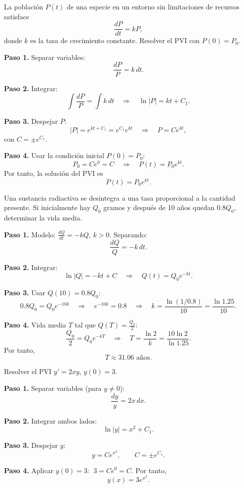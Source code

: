 \begin{example}
La población \(P(t)\) de una especie en un entorno sin limitaciones de recursos satisface
\[
\frac{dP}{dt} = kP,
\]
donde \(k\) es la tasa de crecimiento constante. Resolver el PVI con \(P(0)=P_0\).

\begin{myproof}
\textbf{Paso 1.} Separar variables:
\[
\frac{dP}{P} = k\,dt.
\]

\textbf{Paso 2.} Integrar:
\[
\int \frac{dP}{P} = \int k\,dt \quad\Longrightarrow\quad \ln|P| = kt + C_1.
\]

\textbf{Paso 3.} Despejar \(P\):
\[
|P| = e^{kt+C_1} = e^{C_1}e^{kt} \quad\Longrightarrow\quad P = C e^{kt},
\]
con \(C = \pm e^{C_1}\).

\textbf{Paso 4.} Usar la condición inicial \(P(0)=P_0\):
\[
P_0 = C e^{0} = C \quad\Longrightarrow\quad P(t) = P_0 e^{kt}.
\]
Por tanto, la solución del PVI es
\[
\boxed{P(t) = P_0 e^{kt}}.
\]
\end{myproof}
\end{example}

\begin{example}
Una sustancia radiactiva se desintegra a una tasa proporcional a la cantidad presente. Si inicialmente hay \(Q_0\) gramos y después de 10 años quedan \(0.8Q_0\), determinar la vida media.

\begin{myproof}
\textbf{Paso 1.} Modelo: \(\frac{dQ}{dt} = -kQ\), \(k>0\). Separando:
\[
\frac{dQ}{Q} = -k\,dt.
\]

\textbf{Paso 2.} Integrar:
\[
\ln|Q| = -kt + C \quad\Longrightarrow\quad Q(t) = Q_0 e^{-kt}.
\]

\textbf{Paso 3.} Usar \(Q(10)=0.8Q_0\):
\[
0.8Q_0 = Q_0 e^{-10k} \quad\Longrightarrow\quad e^{-10k}=0.8 \quad\Longrightarrow\quad k = \frac{\ln(1/0.8)}{10} = \frac{\ln 1.25}{10}.
\]

\textbf{Paso 4.} Vida media \(T\) tal que \(Q(T)=\frac{Q_0}{2}\):
\[
\frac{Q_0}{2} = Q_0 e^{-kT} \quad\Longrightarrow\quad T = \frac{\ln 2}{k} = \frac{10\ln 2}{\ln 1.25}.
\]
Por tanto,
\[
\boxed{T \approx 31.06 \text{ años}}.
\]
\end{myproof}
\end{example}

\begin{example}
Resolver el PVI $y'=2xy$, $y(0)=3$.

\begin{myproof}
\textbf{Paso 1.} Separar variables (para $y\neq 0$):
\[
\frac{dy}{y}=2x\,dx.
\]

\textbf{Paso 2.} Integrar ambos lados:
\[
\ln|y|=x^2+C_1.
\]

\textbf{Paso 3.} Despejar $y$:
\[
y=Ce^{x^2},\qquad C=\pm e^{C_1}.
\]

\textbf{Paso 4.} Aplicar $y(0)=3$: $\;3=Ce^{0}=C$. Por tanto,
\[
\boxed{y(x)=3e^{x^2}}.
\]
\end{myproof}
\end{example}


